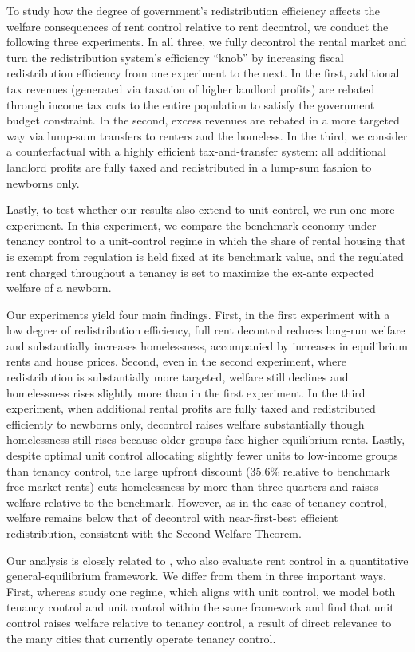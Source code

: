 \documentclass[parskip=full]{article}
\begin{document}
To study how the degree of government's redistribution efficiency affects the welfare consequences of rent control relative to rent decontrol, we conduct the following three experiments. In all three, we fully decontrol the rental market and turn the redistribution system’s efficiency ``knob'' by increasing fiscal redistribution efficiency from one experiment to the next. In the first, additional tax revenues (generated via taxation of higher landlord profits) are rebated through income tax cuts to the entire population to satisfy the government budget constraint. In the second, excess revenues are rebated in a more targeted way via lump-sum transfers to renters and the homeless. In the third, we consider a counterfactual with a highly efficient tax-and-transfer system: all additional landlord profits are fully taxed and redistributed in a lump-sum fashion to newborns only. 

Lastly, to test whether our results also extend to unit control, we run one more experiment. In this experiment, we compare the benchmark economy under tenancy control to a unit-control regime in which the share of rental housing that is exempt from regulation is held fixed at its benchmark value, and the regulated rent charged throughout a tenancy is set to maximize the ex-ante expected welfare of a newborn.

Our experiments yield four main findings. First, in the first experiment with a low degree of redistribution efficiency, full rent decontrol reduces long-run welfare and substantially increases homelessness, accompanied by increases in equilibrium rents and house prices. Second, even in the second experiment, where redistribution is substantially more targeted, welfare still declines and homelessness rises slightly more than in the first experiment. In the third experiment, when additional rental profits are fully taxed and redistributed efficiently to newborns only, decontrol raises welfare substantially though homelessness still rises because older groups face higher equilibrium rents. Lastly, despite optimal unit control allocating slightly fewer units to low-income groups than tenancy control, the large upfront discount (35.6\% relative to benchmark free-market rents) cuts homelessness by more than three quarters and raises welfare relative to the benchmark. However, as in the case of tenancy control, welfare remains below that of decontrol with near-first-best efficient redistribution, consistent with the Second Welfare Theorem.

Our analysis is closely related to \citet{fmn-2023}, who also evaluate rent control in a quantitative general-equilibrium framework. We differ from them in three important ways. First, whereas \citet{fmn-2023} study one regime, which aligns with unit control, we model both tenancy control and unit control within the same framework and find that unit control raises welfare relative to tenancy control, a result of direct relevance to the many cities that currently operate tenancy control.
\end{document}
